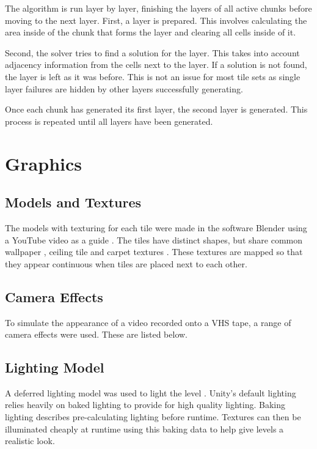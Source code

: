 
The algorithm is run layer by layer, finishing the layers of all active chunks before moving to the next layer. First, a layer is prepared. This involves calculating the area inside of the chunk that forms the layer and clearing all cells inside of it.


Second, the solver tries to find a solution for the layer. This takes into account adjacency information from the cells next to the layer. If a solution is not found, the layer is left as it was before. This is not an issue for most tile sets as single layer failures are hidden by other layers successfully generating.


Once each chunk has generated its first layer, the second layer is generated. This process is repeated until all layers have been generated.


\section{Graphics}
\subsection{Models and Textures}
The models with texturing for each tile were made in the software Blender using a YouTube video as a guide \cite{backroomsGraphics}. The tiles have distinct shapes, but share common wallpaper \cite{sketchfab_texture}, ceiling tile \cite{ceiling_texture} and carpet textures \cite{carpet_texture}. These textures are mapped so that they appear continuous when tiles are placed next to each other.


\subsection{Camera Effects}
To simulate the appearance of a video recorded onto a VHS tape, a range of camera effects were used. These are listed below.


\subsection{Lighting Model}
A deferred lighting model was used to light the level \cite{lighting_models}. Unity's default lighting relies heavily on baked lighting to provide for high quality lighting. Baking lighting describes pre-calculating lighting before runtime. Textures can  then be illuminated cheaply at runtime using this baking data to help give levels a realistic look.

